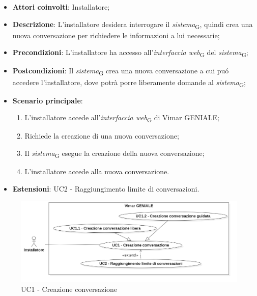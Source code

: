 \begin{itemize}
    \item \textbf{Attori coinvolti}: Installatore;
    \item \textbf{Descrizione}: L’installatore desidera interrogare il \textit{sistema}\textsubscript{G}, quindi crea una nuova conversazione per richiedere le informazioni a lui necessarie;
    \item \textbf{Precondizioni}: L’installatore ha accesso all’\textit{interfaccia web}\textsubscript{G} del \textit{sistema}\textsubscript{G};
    \item \textbf{Postcondizioni}: Il \textit{sistema}\textsubscript{G} crea una nuova conversazione a cui puó accedere l’installatore, dove potrà porre liberamente domande al \textit{sistema}\textsubscript{G};
    \item \textbf{Scenario principale}:
    \begin{enumerate}
        \item L’installatore accede all’\textit{interfaccia web}\textsubscript{G} di Vimar GENIALE;
        \item Richiede la creazione di una nuova conversazione;
        \item Il \textit{sistema}\textsubscript{G} esegue la creazione della nuova conversazione;
        \item  L’installatore accede alla nuova conversazione.
    \end{enumerate}
    \item \textbf{Estensioni}: UC2 - Raggiungimento limite di conversazioni.
\end{itemize}
\begin{figure}[H]
\centering
\includegraphics[width=1\textwidth]{contents/casi_duso/png/UC1.png}
\caption{UC1 - Creazione conversazione}
\end{figure}


